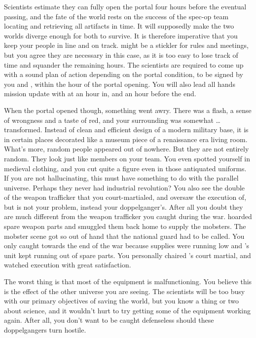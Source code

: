 \documentclass[char]{guildcamp3}
\begin{document}
Scientists estimate they can fully open the portal four hours before the eventual passing, and the fate of the world rests on the success of the spec-op team locating and retrieving all artifacts in time. It will supposedly make the two worlds diverge enough for both to survive. It is therefore imperative that you keep your people in line and on track. \cPoliOne{} might be a stickler for rules and meetings, but you agree they are necessary in this case, as it is too easy to lose track of time and squander the remaining hours. The scientists are required to come up with a sound plan of action depending on the portal condition, to be signed by you and \cPoliOne{}, within the hour of the portal opening. You will also lead all hands mission update with \cPoliOne{} at an hour in, and an hour before the end. 

When the portal opened though, something went awry. There was a flash, a sense of wrongness and a taste of red, and your surrounding was somewhat \ldots transformed. Instead of clean and efficient design of a modern military base, it is in certain places decorated like a museum piece of a renaissance era living room. What's more, random people appeared out of nowhere. But they are not entirely random. They look just like members on your team. You even spotted yourself in medieval clothing, and you cut quite a figure even in those antiquated uniforms. If you are not hallucinating, this must have something to do with the parallel universe. Perhaps they never had industrial revolution? You also see the double of the weapon trafficker that you court-martialed, and oversaw the execution of, but  is not your problem, instead your doppelganger's. After all you doubt they are much different from the weapon trafficker you caught during the war.  hoarded spare weapon parts and smuggled them back home to supply the mobsters. The mobster scene got so out of hand that the national guard had to be called. You only caught \cRogueOne{} towards the end of the war because supplies were running low and \cRogueOne{}'s unit kept running out of spare parts. You personally chaired \cRogueOne{}'s court martial, and watched  execution with great satisfaction.

The worst thing is that most of the equipment is malfunctioning. You believe this is the effect of the other universe you are seeing. The scientists will be too busy with our primary objectives of saving the world, but you know a thing or two about science, and it wouldn't hurt to try getting some of the equipment working again. After all, you don't want to be caught defenseless should these doppelgangers turn hostile.
\end{document}
